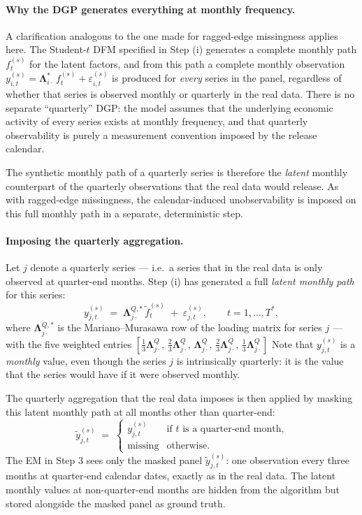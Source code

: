 \documentclass[11pt, a4paper, oneside]{article}
\begin{document}
\paragraph{Why the DGP generates everything at monthly frequency.}
A clarification analogous to the one made for ragged-edge
missingness applies here. The Student-$t$ DFM specified in
Step (i) generates a complete monthly path $f_t^{(s)}$ for the
latent factors, and from this path a complete monthly observation
$y_{i,t}^{(s)} = \boldsymbol{\Lambda}_{i \cdot}^*\, f_t^{(s)} + \varepsilon_{i,t}^{(s)}$
is produced for \emph{every} series in the panel, regardless of
whether that series is observed monthly or quarterly in the real
data. There is no separate ``quarterly'' DGP: the model assumes
that the underlying economic activity of every series exists at
monthly frequency, and that quarterly observability is purely a
measurement convention imposed by the release calendar.

The synthetic monthly path of a quarterly series is therefore the
\emph{latent} monthly counterpart of the quarterly observations
that the real data would release. As with ragged-edge missingness,
the calendar-induced unobservability is imposed on this full
monthly path in a separate, deterministic step.

\paragraph{Imposing the quarterly aggregation.}
Let $j$ denote a quarterly series — i.e.\ a series that in the real
data is only observed at quarter-end months. Step (i) has generated
a full \emph{latent monthly path} for this series:
\[
y_{j, t}^{(s)} \;=\; \boldsymbol{\Lambda}^{Q, *}_{j \cdot}\, \tilde{f}_t^{(s)} \;+\; \varepsilon_{j, t}^{(s)},
\qquad t = 1, \ldots, T^*,
\]
where $\boldsymbol{\Lambda}^{Q, *}_{j \cdot}$ is the Mariano--Murasawa
row of the loading matrix for series $j$ — with the five weighted
entries
$[\tfrac{1}{3}\boldsymbol{\Lambda}^Q_{j \cdot},\, \tfrac{2}{3}\boldsymbol{\Lambda}^Q_{j \cdot},\, \boldsymbol{\Lambda}^Q_{j \cdot},\, \tfrac{2}{3}\boldsymbol{\Lambda}^Q_{j \cdot},\, \tfrac{1}{3}\boldsymbol{\Lambda}^Q_{j \cdot}]$
Note that $y_{j, t}^{(s)}$ is a \emph{monthly} value, even though
the series $j$ is intrinsically quarterly: it is the value that the
series would have if it were observed monthly.

The quarterly aggregation that the real data imposes is then
applied by masking this latent monthly path at all months other
than quarter-end:
\[
\tilde{y}_{j, t}^{(s)} \;=\;
\begin{cases}
y_{j, t}^{(s)} & \text{if $t$ is a quarter-end month,} \\
\text{missing} & \text{otherwise.}
\end{cases}
\]
The EM in Step 3 sees only the masked panel $\tilde{y}_{j, t}^{(s)}$:
one observation every three months at quarter-end calendar dates,
exactly as in the real data. The latent monthly values at
non-quarter-end months are hidden from the algorithm but stored
alongside the masked panel as ground truth.
\end{document}
